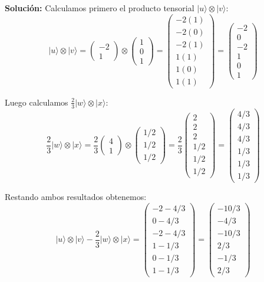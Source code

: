 \documentclass[12pt,a4paper]{article}
\begin{document}
\vspace{0.5em}
\textbf{Solución:}
Calculamos primero el producto tensorial $|u\rangle\otimes|v\rangle$:
$$|u\rangle\otimes|v\rangle = \begin{pmatrix} -2 \\ 1 \end{pmatrix} \otimes \begin{pmatrix} 1 \\ 0 \\ 1 \end{pmatrix} = \begin{pmatrix} -2(1) \\ -2(0) \\ -2(1) \\ 1(1) \\ 1(0) \\ 1(1) \end{pmatrix} = \begin{pmatrix} -2 \\ 0 \\ -2 \\ 1 \\ 0 \\ 1 \end{pmatrix}$$

Luego calculamos $\frac{2}{3}|w\rangle\otimes|x\rangle$:
$$\frac{2}{3}|w\rangle\otimes|x\rangle = \frac{2}{3} \begin{pmatrix} 4 \\ 1 \end{pmatrix} \otimes \begin{pmatrix} 1/2 \\ 1/2 \\ 1/2 \end{pmatrix} = \frac{2}{3} \begin{pmatrix} 2 \\ 2 \\ 2 \\ 1/2 \\ 1/2 \\ 1/2 \end{pmatrix} = \begin{pmatrix} 4/3 \\ 4/3 \\ 4/3 \\ 1/3 \\ 1/3 \\ 1/3 \end{pmatrix}$$

Restando ambos resultados obtenemos:
$$|u\rangle\otimes|v\rangle - \frac{2}{3} |w\rangle\otimes|x\rangle = \begin{pmatrix} -2 - 4/3 \\ 0 - 4/3 \\ -2 - 4/3 \\ 1 - 1/3 \\ 0 - 1/3 \\ 1 - 1/3 \end{pmatrix} = \begin{pmatrix} -10/3 \\ -4/3 \\ -10/3 \\ 2/3 \\ -1/3 \\ 2/3 \end{pmatrix}$$
\end{document}
